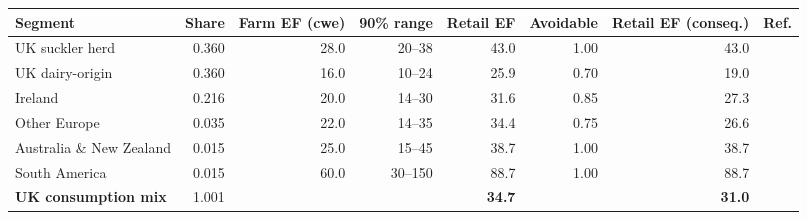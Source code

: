 \begin{tabular}{lrrrrrrl}
\toprule
Segment & Share & Farm EF (cwe) & 90\% range & Retail EF & Avoidable & Retail EF (conseq.) & Ref. \\
\midrule
UK suckler herd & 0.360 & 28.0 & 20--38 & 43.0 & 1.00 & 43.0 & \cite{ciel2020,prism2024} \\
UK dairy-origin & 0.360 & 16.0 & 10--24 & 25.9 & 0.70 & 19.0 & \cite{ciel2020,prism2024} \\
Ireland & 0.216 & 20.0 & 14--30 & 31.6 & 0.85 & 27.3 & \cite{gerber2013,bordbia2024} \\
Other Europe & 0.035 & 22.0 & 14--35 & 34.4 & 0.75 & 26.6 & \cite{gerber2013} \\
Australia \& New Zealand & 0.015 & 25.0 & 15--45 & 38.7 & 1.00 & 38.7 & \cite{gerber2013} \\
South America & 0.015 & 60.0 & 30--150 & 88.7 & 1.00 & 88.7 & \cite{gerber2013,poore2018} \\
\midrule
\textbf{UK consumption mix} & 1.001 &  &  & \textbf{34.7} &  & \textbf{31.0} &  \\
\bottomrule
\end{tabular}
